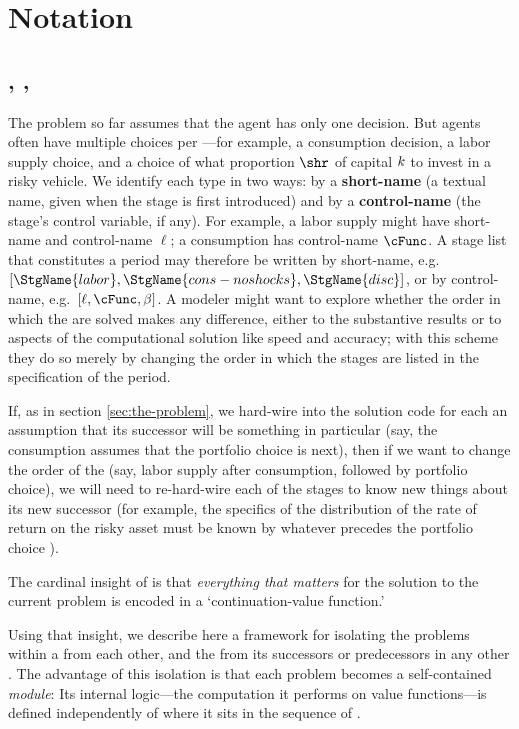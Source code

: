 
\hypertarget{notation}{}
\section{Notation}\label{sec:notation}

\hypertarget{intervals-stages-perches}{}
\subsection{\Intervals, \Stgs, \Prchs}

The problem so far assumes that the agent has only one decision.  But agents often have multiple choices per {\interval}---for example, a consumption decision, a labor supply choice, and a choice of what proportion $\shr$ of capital $k$ to invest in a risky vehicle.  We identify each {\stg} type in two ways: by a \textbf{short-name} (a textual name, given when the stage is first introduced) and by a \textbf{control-name} (the stage's control variable, if any).  For example, a labor supply {\stg} might have short-name  and control-name $\ell$; a consumption {\stg} has control-name $\cFunc$.  A stage list that constitutes a period may therefore be written by short-name, e.g.\ $[\StgName{labor}, \StgName{cons-noshocks}, \StgName{disc}]$, or by control-name, e.g.\ $[\ell, \cFunc, \DiscFac]$. A modeler might want to explore whether the order in which the {\stgs} are solved makes any difference, either to the substantive results or to aspects of the computational solution like speed and accuracy; with this scheme they do so merely by changing the order in which the stages are listed in the specification of the period.

If, as in section \ref{sec:the-problem}, we hard-wire into the solution code for each {\stg} an assumption that its successor {\stg} will be something in particular (say, the consumption {\stg} assumes that the portfolio choice is next), then if we want to change the order of the {\stgs} (say, labor supply after consumption, followed by portfolio choice), we will need to re-hard-wire each of the stages to know new things about its new successor (for example, the specifics of the distribution of the rate of return on the risky asset must be known by whatever {\stg} precedes the portfolio choice {\stg}).

The cardinal insight of \citet{bellman1957} is that \emph{everything that matters} for the solution to the current problem is encoded in a `continuation-value function.'

Using that insight, we describe here a framework for isolating the {\stg} problems within a {\interval} from each other, and the {\interval} from its successors or predecessors in any other {\interval}.  The advantage of this isolation is that each {\stg} problem becomes a self-contained \textit{module}: Its internal logic---the computation it performs on value functions---is defined independently of where it sits in the sequence of {\stgs}.

